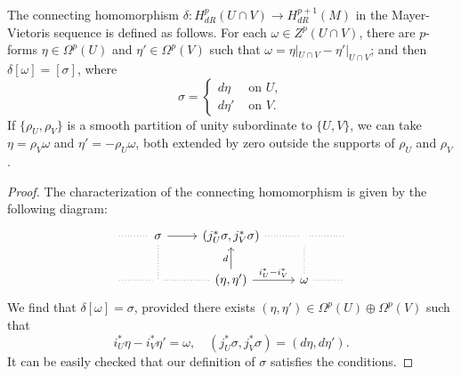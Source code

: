 \begin{corollary}\label{Mayer-Vietoris de Rham connect}
The connecting homomorphism $\delta:H^p_{dR}(U\cap V)\to H^{p+1}_{dR}(M)$ in the Mayer-Vietoris sequence is defined as follows. For each $\omega\in Z^p(U\cap V)$, there 
are $p$-forms $\eta\in\Omega^p(U)$ and $\eta'\in\Omega^p(V)$ such that $\omega=\eta|_{U\cap V}-\eta'|_{U\cap V}$; and then $\delta[\omega]=[\sigma]$, where 
\[\sigma=\begin{cases}
d\eta&\text{ on }U,\\
d\eta'&\text{ on }V.
\end{cases}\]
If $\{\rho_U,\rho_V\}$ is a smooth partition of unity subordinate to $\{U,V\}$, we can take $\eta=\rho_V\omega$ and $\eta'=-\rho_U\omega$, both extended by zero outside 
the supports of $\rho_U$ and $\rho_V$.
\end{corollary}
\begin{proof}
The characterization of the connecting homomorphism is given by the following diagram:
\[\begin{tikzcd}
\ar[r,no head,dotted]&\sigma\ar[r]&(j_U^*\sigma,j_V^*\sigma)\ar[r,no head,dotted]&\ar[r,no head,dotted]&{}\\
\ar[r,no head,dotted]&\ar[r,no head,dotted]\ar[u,no head,dotted]&(\eta,\eta')\ar[r,"i_U^*-i_V^*"]\ar[u,"d"]&\omega\ar[r,no head,dotted]\ar[u,no head,dotted]&{}
\end{tikzcd}\]
We find that $\delta[\omega]=\sigma$, provided there exists $(\eta,\eta')\in\Omega^p(U)\oplus\Omega^p(V)$ such that
\[i_U^*\eta-i_V^*\eta'=\omega,\quad (j_U^*\sigma,j_V^*\sigma)=(d\eta,d\eta').\]
It can be easily checked that our definition of $\sigma$ satisfies the conditions.
\end{proof}
